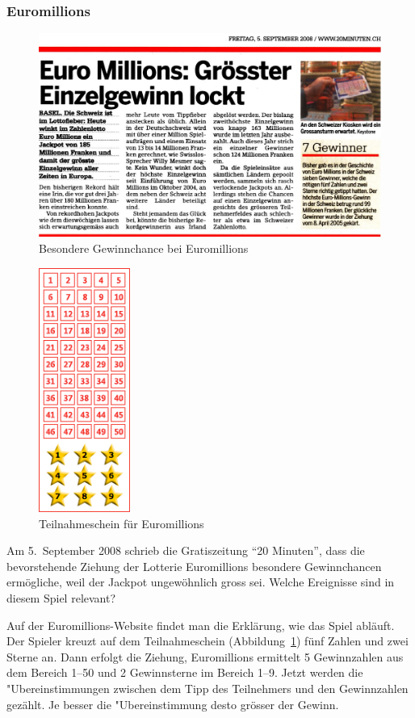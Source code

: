 \subsubsection{Euromillions}
\begin{figure}
\includegraphics[width=\hsize]{graphics/euromillions}
\caption{Besondere Gewinnchance bei Euromillions}
\end{figure}
\begin{figure}
\begin{center}
\includegraphics[height=8cm]{graphics/euromillionsschein}
\end{center}
\caption{Teilnahmeschein für Euromillions\label{euromillionsschein}}
\end{figure}
Am 5.~September 2008 schrieb die Gratiszeitung ``20 Minuten'', dass die
bevorstehende Ziehung der Lotterie Euromillions besondere Gewinnchancen 
ermögliche, weil der Jackpot ungewöhnlich gross sei.
Welche Ereignisse
sind in diesem Spiel relevant?

Auf der Euromillions-Website findet man die Erklärung, wie das Spiel abläuft.
Der Spieler kreuzt auf dem Teilnahmeschein (Abbildung~\ref{euromillionsschein})
fünf Zahlen und zwei Sterne an.
Dann erfolgt die Ziehung, Euromillions ermittelt
5 Gewinnzahlen aus dem Bereich 1--50 und 2 Gewinnsterne im Bereich 1--9.
Jetzt werden die "Ubereinstimmungen zwischen dem Tipp des Teilnehmers und den
Gewinnzahlen gezählt.
Je besser die "Ubereinstimmung desto grösser der Gewinn.

